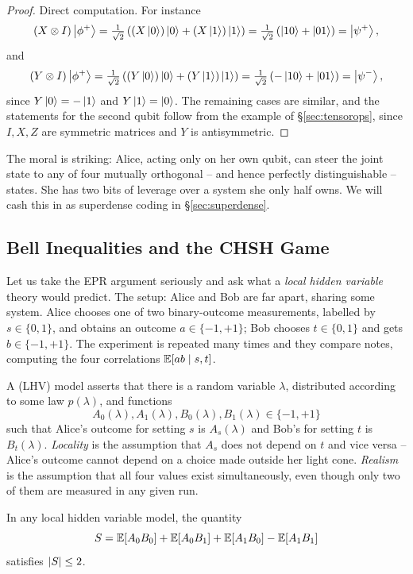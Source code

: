 \documentclass[a4paper]{scrartcl}
\begin{document}
\begin{proof}
	Direct computation. For instance
	$$(X\otimes I)\ket{\phi^+} = \tfrac{1}{\sqrt2}\left((X\ket{0})\ket{0} + (X\ket{1})\ket{1}\right) = \tfrac{1}{\sqrt2}\left(\ket{10}+\ket{01}\right) = \ket{\psi^+},$$
	and
	$$(Y\otimes I)\ket{\phi^+} = \tfrac1{\sqrt2}\left((Y\ket{0})\ket{0} + (Y\ket{1})\ket{1}\right) = \tfrac1{\sqrt2}\left(-\ket{10}+\ket{01}\right) = \ket{\psi^-},$$
	since $Y\ket{0} = -\ket{1}$ and $Y\ket{1} = \ket{0}$. The remaining cases are similar, and the statements for the second qubit follow from the example of \S\ref{sec:tensorops}, since $I,X,Z$ are symmetric matrices and $Y$ is antisymmetric.
\end{proof}

The moral is striking: Alice, acting only on her own qubit, can steer the joint state to any of four mutually orthogonal -- and hence perfectly distinguishable -- states. She has two bits of leverage over a system she only half owns. We will cash this in as superdense coding in \S\ref{sec:superdense}.

\subsection{Bell Inequalities and the CHSH Game}

Let us take the EPR argument seriously and ask what a \emph{local hidden variable} theory would predict. The setup: Alice and Bob are far apart, sharing some system. Alice chooses one of two binary-outcome measurements, labelled by $s \in \{0,1\}$, and obtains an outcome $a \in \{-1,+1\}$; Bob chooses $t \in \{0,1\}$ and gets $b \in \{-1,+1\}$. The experiment is repeated many times and they compare notes, computing the four correlations $\mathbb{E}[ab \mid s,t]$.

A  (LHV) model asserts that there is a random variable $\lambda$, distributed according to some law $p(\lambda)$, and functions
$$A_0(\lambda), A_1(\lambda), B_0(\lambda), B_1(\lambda) \in \{-1,+1\}$$
such that Alice's outcome for setting $s$ is $A_s(\lambda)$ and Bob's for setting $t$ is $B_t(\lambda)$. \emph{Locality} is the assumption that $A_s$ does not depend on $t$ and vice versa -- Alice's outcome cannot depend on a choice made outside her light cone. \emph{Realism} is the assumption that all four values exist simultaneously, even though only two of them are measured in any given run.

\begin{theorem}
	In any local hidden variable model, the quantity
	$$S = \mathbb{E}[A_0B_0] + \mathbb{E}[A_0B_1] + \mathbb{E}[A_1B_0] - \mathbb{E}[A_1B_1]$$
	satisfies $\lvert S\rvert \leq 2$.
\end{theorem}
\end{document}
